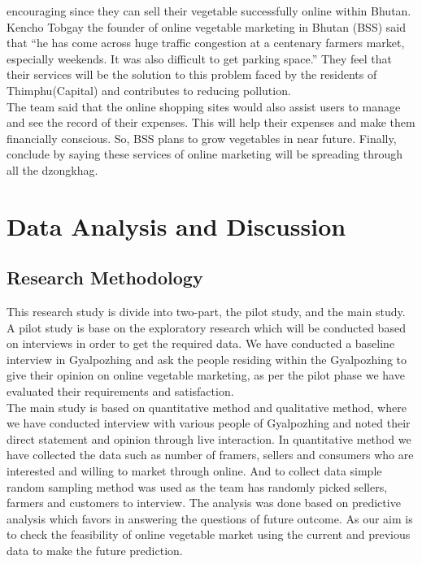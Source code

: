 \documentclass[12pt]{report}
\begin{document}
\begin{normalsize}
encouraging since they can sell their vegetable successfully online within Bhutan.\newline\\[0.1cm]
Kencho Tobgay the founder of online vegetable marketing in Bhutan (BSS) said that “he has come
across huge traffic congestion at a centenary farmers market, especially weekends. It was also
difficult to get parking space.” They feel that their services will be the solution to this problem
faced by the residents of Thimphu(Capital) and contributes to reducing pollution.\newline\\[0.1cm]
The team said that the online shopping sites would also assist users to manage and see the record
of their expenses. This will help their expenses and make them financially conscious. So, BSS plans
to grow vegetables in near future. Finally, conclude by saying these services of online marketing
will be spreading through all the dzongkhag.



\newpage
	
\chapter{Data Analysis and Discussion}	
\label{chapter_analysis}		
		

\section{Research Methodology}
This research study is divide into two-part, the pilot study, and the main study. A pilot study is base on the exploratory research which will be conducted based on interviews in order to get the required data. We have conducted a baseline interview in Gyalpozhing and ask the people residing within the Gyalpozhing to give their opinion on online vegetable marketing, as per the pilot phase we have evaluated their requirements and satisfaction.\newline\\[0.1cm] 
The main study is based on quantitative method and qualitative method, where we have conducted interview with various
people of Gyalpozhing and noted their direct statement and opinion through live interaction. In quantitative method we have collected the data such as number of framers, sellers and consumers who are interested and willing to market through online. And to collect data simple random sampling method was used as the team has randomly picked sellers, farmers and customers to interview. The analysis was done based on predictive analysis which favors in answering the questions of future outcome. As our aim is to check the feasibility of online vegetable market using the current and previous data to make the future prediction.  






\end{normalsize}
\end{document}
